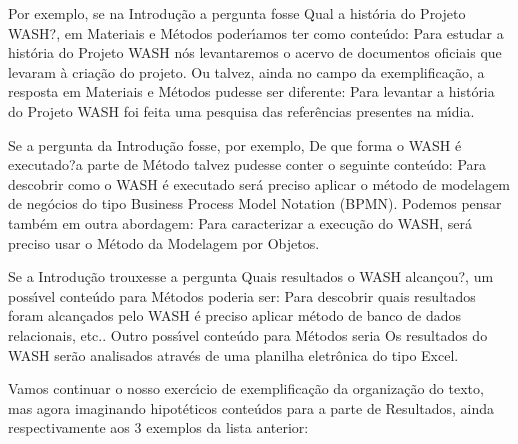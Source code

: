 \documentclass[
12pt,		%
openright,	%
twoside,  %
a4paper,			%
chapter=TITLE,		%
english,			%
french,				%
spanish,			%
brazil				%
]{USPSC-classe/USPSC_RedarTex}
\begin{document}
\begin{alineas}
\item Por exemplo, se na Introdu\c{c}\~ao a pergunta fosse \textquotedbl Qual a hist\'oria do Projeto WASH?\textquotedbl , em Materiais e M\'etodos poder\'{\i}amos ter como  conte\'udo: \textquotedbl Para estudar a hist\'oria do Projeto WASH n\'os levantaremos o acervo de documentos oficiais que levaram \`a cria\c{c}\~ao do projeto\textquotedbl . Ou talvez, ainda no campo da exemplifica\c{c}\~ao, a resposta em Materiais e M\'etodos pudesse ser diferente: \textquotedbl Para levantar a hist\'oria do Projeto WASH foi feita uma pesquisa das refer\^encias presentes na m\'{\i}dia\textquotedbl .
\item Se a pergunta da Introdu\c{c}\~ao fosse, por exemplo, \textquotedbl De que forma o WASH \'e executado?\textquotedbl  a parte de M\'etodo talvez pudesse conter o seguinte conte\'udo: \textquotedbl Para descobrir como o WASH \'e executado ser\'a preciso aplicar o m\'etodo de modelagem de neg\'ocios do tipo Business Process Model Notation (BPMN)\textquotedbl . Podemos pensar tamb\'em em outra abordagem: \textquotedbl Para caracterizar a execu\c{c}\~ao do WASH, ser\'a preciso usar o M\'etodo da Modelagem por Objetos\textquotedbl .
\item Se a Introdu\c{c}\~ao trouxesse a pergunta \textquotedbl Quais resultados o WASH alcan\c{c}ou?\textquotedbl , um poss\'{\i}vel conte\'udo para M\'etodos poderia ser: \textquotedbl Para descobrir quais resultados foram alcan\c{c}ados pelo WASH \'e preciso aplicar m\'etodo de banco de dados relacionais, etc.\textquotedbl . Outro poss\'{\i}vel conte\'udo para M\'etodos seria \textquotedbl Os resultados do WASH ser\~ao analisados atrav\'es de uma planilha eletr\^onica do tipo Excel\textquotedbl .
\end{alineas}

Vamos continuar o nosso exerc\'{\i}cio de exemplifica\c{c}\~ao da organiza\c{c}\~ao do texto, mas agora imaginando hipot\'eticos conte\'udos para a parte de Resultados, ainda respectivamente aos 3 exemplos da lista anterior:
\end{document}
